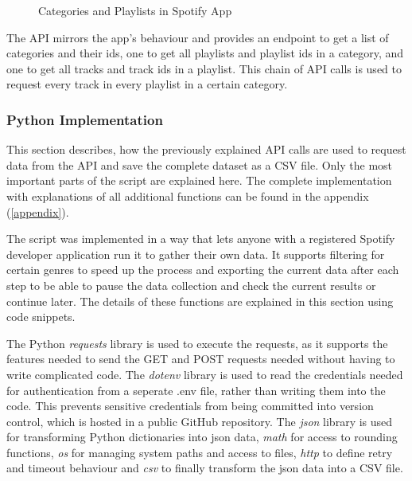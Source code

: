 \begin{figure}[H]
    \centering
    \qquad
    \caption{Categories and Playlists in Spotify App}%
    \label{fig:Categories and Playlists in Spotify App}%
\end{figure}

The API mirrors the app's behaviour and provides an endpoint to get a list of categories and their ids,
one to get all playlists and playlist ids in a category, and one to get all tracks and track ids in
a playlist. This chain of API calls is used to request every track in every playlist in a certain category.


\subsubsection{Python Implementation}

This section describes, how the previously explained API calls are used to request data from the API
and save the complete dataset as a CSV file.
Only the most important parts of the script are explained here. The complete implementation with
explanations of all additional functions can be found in the appendix (\ref{appendix}).

The script was implemented in a way that lets anyone with a registered Spotify
developer application run it to gather their own data.
It supports filtering for certain genres to speed up the process and exporting the current data after each step
to be able to pause the data collection and check the current results or continue later.
The details of these functions are explained in this section using code snippets.

The Python \emph{requests} library is used to execute the requests, as it supports the features needed to send the GET and POST
requests needed without having to write complicated code.
The \emph{dotenv} library is used to read the credentials needed for authentication from a seperate .env file,
rather than writing them into the code.
This prevents sensitive credentials from being committed into version control, which is hosted in a public GitHub repository.
The \emph{json} library is used for transforming Python dictionaries into json data, \emph{math} for access to rounding functions,
\emph{os} for managing system paths and access to files, \emph{http} to define retry and timeout behaviour and \emph{csv}
to finally transform the json data into a CSV file.

